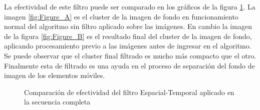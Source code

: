 La efectividad de este filtro puede ser comparado en los gráficos de la figura \ref{fig:result_spatio_temporal_filter}. La imagen \ref{fig:Figure_A} es el cluster de la imagen de fondo en funcionamiento normal del algoritmo sin filtro aplicado sobre las imágenes. En cambio la imagen de la figura \ref{fig:Figure_B} es el resultado final del cluster de la imagen de fondo,  aplicando procesamiento previo a las imágenes antes de ingresar en el algoritmo. Se puede observar que el cluster final filtrado es mucho más compacto que el otro. Finalmente esta de filtrado es una ayuda en el proceso de separación del fondo de imagen de los elementos móviles.

\begin{figure}[!h]
\centering     %
{}
\caption[Comparación de efectividad del filtro en una secuencia completa]{Comparación de efectividad del filtro Espacial-Temporal aplicado en la secuencia completa }
\label{fig:result_spatio_temporal_filter}
\end{figure}

\newpage

